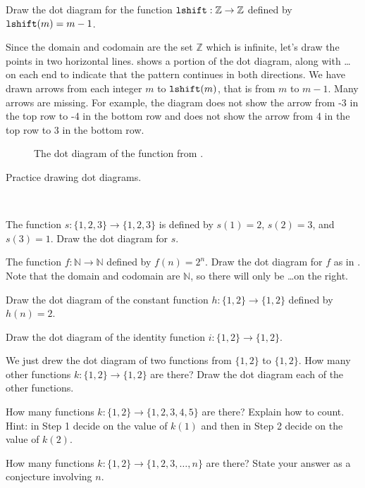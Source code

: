 \begin{exam}
\label{exam_dot_diagram_shift_left1}
    Draw the dot diagram for the function $\texttt{lshift}: \mathbb{Z} \to \mathbb{Z}$ defined by $\texttt{lshift}(m) = m-1$.
    \begin{soln}
        Since the domain and codomain are the set $\mathbb{Z}$ which is infinite, let's draw the points in two horizontal lines.   shows a portion of the dot diagram, along with \ldots on each end to indicate that the pattern continues in both directions. We have drawn arrows from each integer $m$ to $\texttt{lshift}(m)$, that is from $m$ to $m-1$. Many arrows are missing.  For example, the diagram does not show the arrow from -3 in the top row to -4 in the bottom row and does not show the arrow from 4 in the top row to 3 in the bottom row.
            \begin{figure}[htbp]
                \centering
                
                \caption{The dot diagram of the function from .}
                \label{fig_dot_diagram_shift_left1}
            \end{figure}
    \end{soln}
\end{exam}

Practice drawing dot diagrams.

\begin{act}
\label{act_fn_dot_diagrams}  
~
        \begin{apart}
            \item The function $s: \{1,2,3\} \to \{1,2,3\}$ is defined by $s(1) = 2$, $s(2) = 3$, and $s(3) = 1$.  Draw the dot diagram for $s$.
            \item The function $f: \mathbb{N} \to \mathbb{N}$ defined by $f(n) = 2^n$. Draw the dot diagram for $f$ as in .  Note that the domain and codomain are $\mathbb{N}$, so there will only be \ldots on the right.          
            \item Draw the dot diagram of the constant function $h:\{1,2\} \to \{1,2\}$ defined by $h(n)=2$.  
            \item Draw the dot diagram of the identity function $i:\{1,2\} \to \{1,2\}$. 
            \item We just drew the dot diagram of two functions from $\{1,2\}$ to $\{1,2\}$.  How many other functions $k:\{1,2\} \to \{1,2\}$ are there?  Draw the dot diagram each of the other functions.
            \item How many functions $k: \{1,2\} \to \{1,2,3,4,5\}$ are there? Explain how to count. Hint: in Step 1 decide on the value of $k(1)$ and then in Step 2 decide on the value of $k(2)$.
            \item How many functions $k: \{1,2\} \to \{1,2,3,\ldots, n\}$ are there? State your answer as a conjecture involving $n$.
        \end{apart}
\end{act}

